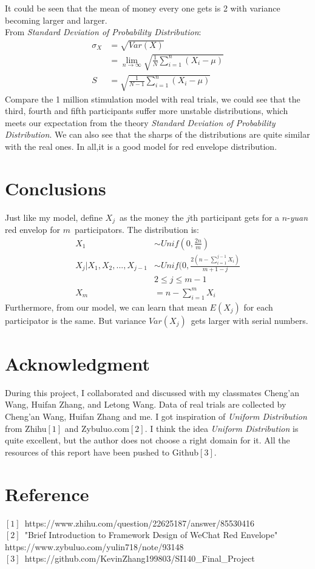 \documentclass[10pt,journal]{IEEEtran}
\begin{document}
It could be seen that the mean of money every one gets is 2 with variance becoming larger and larger.
\\
From \emph{Standard Deviation of Probability Distribution}:
\[
	\begin{split}
		\sigma_X&=\sqrt{Var(X)}
		\\
		&=\lim\limits_{n\rightarrow\infty}\sqrt{\frac{1}{N}\sum_{i=1}^{n}(X_i-\mu)}
		\\
		S&=\sqrt{\frac{1}{N-1}\sum_{i=1}^{n}(X_i-\mu)}
	\end{split}
\]
Compare the 1 million stimulation model with real trials, we could see that the third, fourth and fifth participants suffer more unstable distributions, which meets our expectation from the theory \emph{Standard Deviation of Probability Distribution}. We can also see that the sharps of the distributions are quite similar with the real ones. In all,it is a good model for red envelope distribution.
\section{Conclusions}
Just like my model, define \(X_j\)\ as the money the \(j\)th participant gets for a \(n\)-\emph{yuan} red envelop for \(m\)\ participators. The distribution is:
\[
	\begin{split}
		X_1&\sim Unif(0,\frac{2n}{m})
		\\
		X_j|X_1,X_2,...,X_{j-1}&\sim Unif(0,\frac{2(n-\sum_{i=1}^{j-1}X_i)}{m+1-j}
		\\
		&2\leq j\leq m-1
		\\
		X_m&=n-\sum_{i=1}^{m}X_i
	\end{split}
\] 
Furthermore, from our model, we can learn that mean \(E(X_j)\) for each participator is the same. But variance \(Var(X_j)\)\ gets larger with serial numbers.

\section*{Acknowledgment}
During this project, I collaborated and discussed with my classmates Cheng'an Wang, Huifan Zhang, and Letong Wang. Data of real trials are collected by Cheng'an Wang, Huifan Zhang and me. I got inspiration of \emph{Uniform Distribution} from Zhihu\(\left[ 1 \right]\) and Zybuluo.com\(\left[ 2 \right]\). I think the idea \emph{Uniform Distribution} is quite excellent, but the author does not choose a right domain for it. All the resources of this report have been pushed to Github\(\left[ 3 \right]\).



%
%
\section*{Reference}
\(\left[ 1\right]\)\ https://www.zhihu.com/question/22625187/answer/85530416
\\
\(\left[ 2\right]\)\ "Brief Introduction to Framework Design of WeChat Red Envelope" https://www.zybuluo.com/yulin718/note/93148
\\
\(\left[ 3\right]\)\ https://github.com/KevinZhang199803/SI140\_Final\_Project
\end{document}
